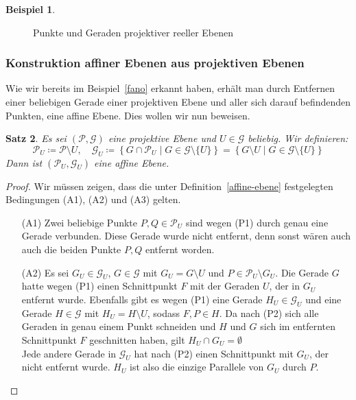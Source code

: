 \documentclass[hidelinks]{article}
\theoremstyle{plain}
\newtheorem{thm}{Satz}[section]
\theoremstyle{definition}
\newtheorem{bsp}[thm]{Beispiel}
\theoremstyle{rem}
\newcommand{\pu}{\mathcal{P}_U}
\newcommand{\gu}{\mathcal{G}_U}
\begin{document}
\begin{sloppypar}
\begin{bsp}
\begin{figure}[H]
	\caption{Punkte und Geraden projektiver reeller Ebenen}
\end{figure}
\end{bsp}


\subsubsection{Konstruktion affiner Ebenen aus projektiven Ebenen} \label{konstr-aff-aus-proj}
Wie wir bereits im Beispiel~\ref{fano} erkannt haben, erhält man durch Entfernen einer beliebigen Gerade einer projektiven Ebene und aller sich darauf befindenden Punkten, eine affine Ebene. Dies wollen wir nun beweisen.
\begin{thm} \label{projektive-zu-affinen}
Es sei $(\mathcal{P},\mathcal{G})$ eine projektive Ebene und $U\in\mathcal{G}$ beliebig. Wir definieren:
\begin{equation*}
	\pu\coloneqq\mathcal{P}\setminus{U},\quad \gu\coloneqq\left\{G\cap\pu\mid G\in\mathcal{G}\setminus\{U\}\right\}=\left\{G\setminus U\mid G\in\mathcal{G}\setminus \{U\}\right\}
\end{equation*}
Dann ist $(\pu,\gu)$ eine affine Ebene.
\end{thm}
\begin{proof}
Wir müssen zeigen, dass die unter Definition~\ref{affine-ebene} festgelegten Bedingungen (A1), (A2) und (A3) gelten.
\begin{enumerate}
	\item[(A1)] Zwei beliebige Punkte $P,Q\in\pu$ sind wegen (P1) durch genau eine Gerade verbunden. Diese Gerade wurde nicht entfernt, denn sonst wären auch auch die beiden Punkte $P,Q$ entfernt worden.
	\item[(A2)] Es sei $G_U\in\gu$, $G\in\mathcal{G}$ mit $G_U=G\setminus U$ und $P\in\pu\setminus G_U$. Die Gerade $G$ hatte wegen (P1) einen Schnittpunkt $F$ mit der Geraden $U$, der in $G_U$ entfernt wurde. Ebenfalls gibt es wegen (P1) eine Gerade $H_U\in\gu$ und eine Gerade $H\in\mathcal{G}$ mit $H_U=H\setminus U$, sodass $F,P\in H$. Da nach (P2) sich alle Geraden in genau einem Punkt schneiden und $H$ und $G$ sich im entfernten Schnittpunkt $F$ geschnitten haben, gilt $H_U\cap G_U=\emptyset$\\
	Jede andere Gerade in $\gu$ hat nach (P2) einen Schnittpunkt mit $G_U$, der nicht entfernt wurde. $H_U$ ist also die einzige Parallele von $G_U$ durch $P$.

\end{enumerate}
\end{proof}
\end{sloppypar}
\end{document}
